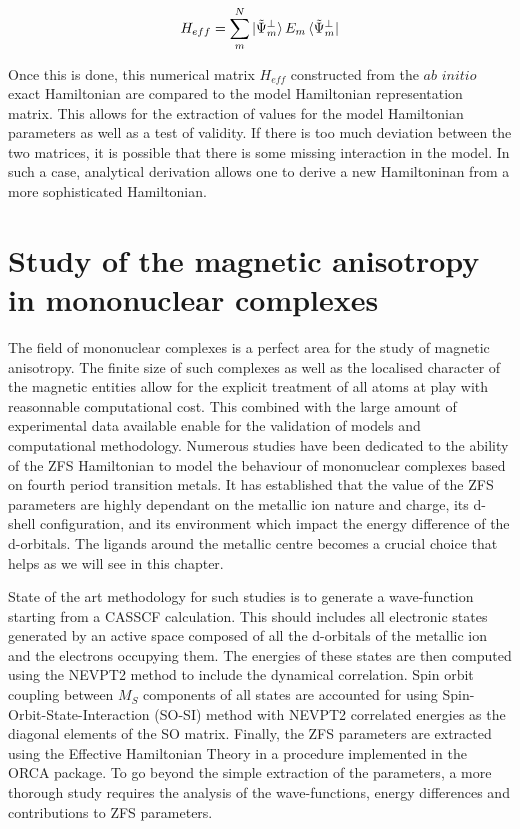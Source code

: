 \documentclass[12pt]{report}
\numberwithin{equation}{section}
\begin{document}
\begin{equation}
    H_{eff}=\sum_{m}^{N}\ket{\tilde{\Psi}_m^{\bot}}E_m \bra{\tilde{\Psi}_m^{\bot}}
\end{equation}

Once this is done, this numerical matrix $H_{eff}$ constructed from the $\textit{ab}$ $\textit{initio}$ exact Hamiltonian are compared to the model Hamiltonian representation matrix. 
This allows for the extraction of values for the model Hamiltonian parameters as well as a test of validity.
If there is too much deviation between the two matrices, it is possible that there is some missing interaction in the model.
In such a case, analytical derivation allows one to derive a new Hamiltoninan from a more sophisticated Hamiltonian.

\chapter{Study of the magnetic anisotropy in mononuclear complexes}
\label{MonoNucl}

The field of mononuclear complexes is a perfect area for the study of magnetic anisotropy. 
The finite size of such complexes as well as the localised character of the magnetic entities allow for the explicit treatment of all atoms at play with reasonnable computational cost.
This combined with the large amount of experimental data available enable for the validation of models and computational methodology.
Numerous studies have been dedicated to the ability of the ZFS Hamiltonian to model the behaviour of mononuclear complexes based on fourth period transition metals.
It has established that the value of the ZFS parameters are highly dependant on the metallic ion nature and charge, its d-shell configuration, and its environment which impact the energy difference of the d-orbitals.
The ligands around the metallic centre becomes a crucial choice that helps  as we will see in this chapter.
\par State of the art methodology for such studies is to generate a wave-function starting from a CASSCF calculation. This should includes all electronic states generated by an active space composed of all the d-orbitals of the metallic ion and the electrons occupying them. 
The energies of these states are then computed using the NEVPT2 method to include the dynamical correlation.
Spin orbit coupling between $M_S$ components of all states are accounted for using Spin-Orbit-State-Interaction (SO-SI) method with NEVPT2 correlated energies as the diagonal elements of the SO matrix.
Finally, the ZFS parameters are extracted using the Effective Hamiltonian Theory in a procedure implemented in the ORCA package.
To go beyond the simple extraction of the parameters, a more thorough study requires the analysis of the wave-functions, energy differences and contributions to ZFS parameters.
\end{document}
